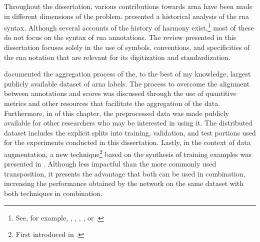 
Throughout the dissertation, various contributions towards
\gls{arna} have been made in different dimensions of the
problem. 
presented a historical analysis of the \gls{rna} syntax.
Although several accounts of the history of harmony
exist,\footnote{See, for example,
\textcite{wason1985viennese}, \textcite{grave1988praise},
\textcite{christensen2002tonality},
\textcite{laitz2010graduate}, or
\textcite{sansallovich2013quintas}.} most of these do not
focus on the syntax of \gls{rna} annotations. The review
presented in this dissertation focuses solely in the use of
symbols, conventions, and specificities of the \gls{rna}
notation that are relevant for its digitization and
standardization.

 documented the
aggregation process of the, to the best of my knowledge,
largest publicly available dataset of \gls{arna} labels.
The process to overcome the alignment between annotations
and scores was discussed through the use of quantitive
metrics and other resources that facilitate the aggregation
of the data. Furthermore, in  of
this chapter, the preprocessed data was made publicly
available for other researchers who may be interested in
using it. The distributed dataset includes the explicit
splits into training, validation, and test portions used for
the experiments conducted in this dissertation. Lastly, in
the context of data augmentation, a new
technique\footnote{First introduced in
\textcite{napoleslopez2021augmentednet}.} based on the
synthesis of training examples was presented in
. Although less
impactful than the more commonly used transposition, it
presents the advantage that both can be used in combination,
increasing the performance obtained by the network on the
same dataset with both techniques in combination.

